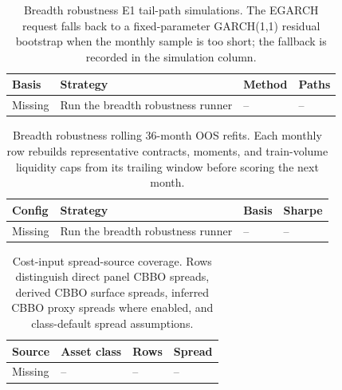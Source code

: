 \begin{table}[H]
\centering
\scriptsize
{}
  {\resizebox{\textwidth}{!}{}}
  {\begin{tabular}{llll}\toprule Basis & Strategy & Method & Paths \\\midrule Missing & Run the breadth robustness runner & -- & -- \\\bottomrule\end{tabular}}
\caption{Breadth robustness E1 tail-path simulations. The EGARCH request falls back to a
fixed-parameter GARCH(1,1) residual bootstrap when the monthly sample is too short; the
fallback is recorded in the simulation column.}
\label{tab:breadth_robustness_simulation_app}
\end{table}

\begin{table}[H]
\centering
\scriptsize
{}
  {\resizebox{\textwidth}{!}{}}
  {\begin{tabular}{llll}\toprule Config & Strategy & Basis & Sharpe \\\midrule Missing & Run the breadth robustness runner & -- & -- \\\bottomrule\end{tabular}}
\caption{Breadth robustness rolling 36-month OOS refits. Each monthly row rebuilds
representative contracts, moments, and train-volume liquidity caps from its trailing
window before scoring the next month.}
\label{tab:breadth_robustness_rolling_app}
\end{table}

\begin{table}[H]
\centering
\scriptsize
{}
  {\resizebox{0.84\textwidth}{!}{}}
  {\begin{tabular}{llll}\toprule Source & Asset class & Rows & Spread \\\midrule Missing & -- & -- & -- \\\bottomrule\end{tabular}}
\caption{Cost-input spread-source coverage. Rows distinguish direct panel CBBO spreads,
derived CBBO surface spreads, inferred CBBO proxy spreads where enabled, and class-default
spread assumptions.}
\label{tab:cost_input_spread_source_app}
\end{table}

